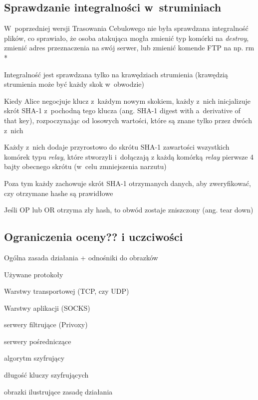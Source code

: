  \subsection{Sprawdzanie integralności w~struminiach}
  \begin{description}
    \item W~poprzedniej wersji Trasowania Cebulowego nie była sprawdzana integralność plików, co sprawiało, że osoba atakująca mogła zmienić typ komórki na \textit{destroy}, zmienić adres przeznaczenia na swój serwer, lub zmienić komende FTP na np. rm *
    \item Integralność jest sprawdzana tylko na krawędziach strumienia (krawędzią strumienia może być każdy skok w~obwodzie)
    \item Kiedy Alice negocjuje klucz z~każdym nowym skokiem, każdy z~nich inicjalizuje skrót SHA-1 z~pochodną tego klucza (ang. SHA-1 digest with a~derivative of that key), rozpoczynając od losowych wartości, które są znane tylko przez dwóch z~nich
    \item Każdy z~nich dodaje przyrostowo do skrótu SHA-1 zawartości wszystkich komórek typu \textit{relay}, które stworzyli i~dołączają z każdą komórką \textit{relay} pierwsze 4 bajty obecnego skrótu (w~celu zmniejszenia narzutu)
    \item Poza tym każdy zachowuje skrót SHA-1 otrzymanych danych, aby zweryfikować, czy otrzymane hashe są prawidłowe 
    \item Jeśli OP lub OR otrzyma zły hash, to obwód zostaje zniszczony (ang. tear down)
  \end{description}

\subsection{Ograniczenia oceny?? i uczciwości}
\begin{description}
  \item 
\end{description}
   
\begin{description}
 \item Ogólna zasada działania + odnośniki do obrazków
 \item Używane protokoły
 \begin{description}
  \item Warstwy transportowej (TCP, czy UDP)
  \item Warstwy aplikacji (SOCKS)
  \item 
 \end{description}
 \item serwery filtrujące (Privoxy)
 \item serwery pośredniczące
 \item algorytm szyfrujący
 \item długość kluczy szyfrujących
 \item obrazki ilustrujące zasadę działania
\end{description}

